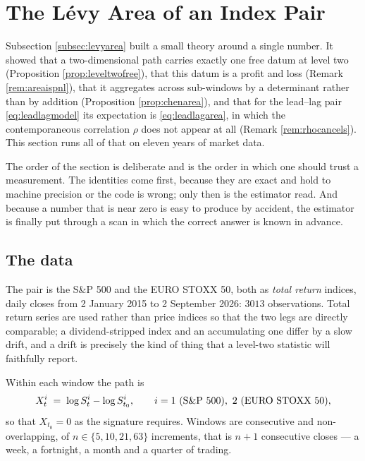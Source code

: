\section{The L\'evy Area of an Index Pair}
\label{sec:levyresults}

Subsection \ref{subsec:levyarea} built a small theory around a single number. It showed that a
two-dimensional path carries exactly one free datum at level two (Proposition
\ref{prop:leveltwofree}), that this datum is a profit and loss (Remark \ref{rem:areaispnl}), that it
aggregates across sub-windows by a determinant rather than by addition (Proposition
\ref{prop:chenarea}), and that for the lead--lag pair \eqref{eq:leadlagmodel} its expectation is
\eqref{eq:leadlagarea}, in which the contemporaneous correlation $\rho$ does not appear at all
(Remark \ref{rem:rhocancels}). This section runs all of that on eleven years of market data.

The order of the section is deliberate and is the order in which one should trust a measurement. The
identities come first, because they are exact and hold to machine precision or the code is wrong;
only then is the estimator read. And because a number that is near zero is easy to produce by
accident, the estimator is finally put through a scan in which the correct answer is known in
advance.


\subsection{The data}
\label{subsec:levydata}

The pair is the S\&P 500 and the EURO STOXX 50, both as \emph{total return} indices, daily closes
from 2 January 2015 to 2 September 2026: $3013$ observations. Total return series are used rather
than price indices so that the two legs are directly comparable; a dividend-stripped index and an
accumulating one differ by a slow drift, and a drift is precisely the kind of thing that a level-two
statistic will faithfully report.

Within each window the path is
\[
  X^{i}_{t} \;=\; \log S^{i}_{t}-\log S^{i}_{t_{0}},
  \qquad i=1 \text{ (S\&P 500)},\ 2 \text{ (EURO STOXX 50)},
\]
so that $X_{t_{0}}=0$ as the signature requires. Windows are consecutive and non-overlapping, of
$n\in\{5,10,21,63\}$ increments, that is $n+1$ consecutive closes --- a week, a fortnight, a month and a quarter of trading.

